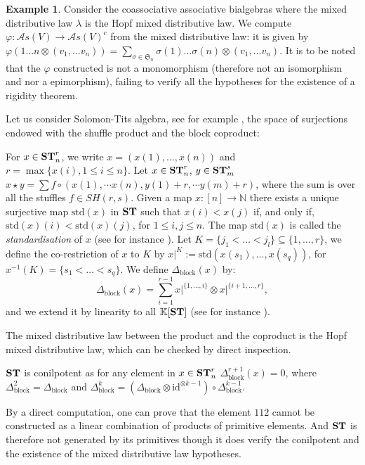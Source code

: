 \documentclass[11pt,leqno]{amsart}
\theoremstyle{definition}
\newtheorem{example}[definition]{Example}
\theoremstyle{plain}
\begin{document}
\begin{example}\label{expleST}
Consider the coassociative associative bialgebras where the mixed distributive law $\lambda$ is the Hopf mixed distributive law.  We compute $\varphi: \mathcal{A}s(V)\to\mathcal{A}s(V)^c$ from the mixed distributive law: it is given by $\varphi(1\ldots n \otimes (v_1, \ldots v_n)) = \sum_{\sigma \in \mathfrak{S}_n} \sigma(1)\ldots\sigma(n) \otimes (v_1, \ldots v_n)$. It is to be noted that the $\varphi$ constructed is not a monomorphism (therefore not an isomorphism and nor a epimorphism), failing to verify all the hypotheses for the existence of a rigidity theorem.

Let us consider Solomon-Tits algebra, see for example \cite{Novelli-Thibon, FNT, Burgunder-Ronco}, the space of surjections endowed with the shuffle product and the block coproduct: 

For $x\in {\mbox {\bf ST}_n^r}$, we write $x = (x(1),\dots ,x(n))$ and $r=\max\{x(i),1\leq i\leq n\}$. Let $x\in {\mbox {\bf ST}_n^r}$, $y\in {\mbox {\bf ST}_m^s}$ $x\star y= \sum f\circ (x(1),\cdots x(n),y(1)+r,\cdots y(m)+r)$, where the sum is over all the stuffles $f\in SH(r,s)$.  Given a map $x:[n]\longrightarrow {\mathbb N}$ there exists a unique surjective map ${\mbox {std}(x)}$ in $ {\mbox {\bf ST}}$ such that $x(i) <x (j)$ if, and only if, ${\mbox {std}(x)}(i) < {\mbox {std}(x)}(j)$, for $1\leq i,j\leq n$. The map ${\mbox {std}(x)}$ is called the {\it standardisation} of $x$ (see for instance \cite{Novelli-Thibon}).  Let $K=\{ j_1<\dots <j_l\}\subseteq \{1,\dots ,r\}$, we define the co-restriction of $x$ to $K$ by $x\vert ^K:={\mbox {std}(x(s_1),\dots ,x(s_q))}$, for $x^{-1}(K)=\{ s_1<\dots <s_q\}$. We define $\Delta_{\textrm{block}}(x)$  by:
\vspace{-0.3cm}
\begin{equation*}
\Delta_{\textrm{block}} (x) = \sum _{i=1}^{r-1} x\vert ^{\{1,\dots , i\}}\otimes x\vert ^{\{ i+1, \dots , r\}},
\end{equation*}
and we extend it by linearity to all $\mathbb K[{\mbox {\bf ST}}]$ (see for instance \cite{Burgunder-Ronco}).


The mixed distributive law between the product and the coproduct is the Hopf mixed distributive law, which can be checked by direct inspection.

 ${\mbox {\bf ST}}$ is conilpotent as for any element in $x\in{\mbox {\bf ST}_n^r}$ $\Delta_{\textrm{block}}^{r+1}(x)=0$, where $\Delta_{\textrm{block}}^2=\Delta_{\textrm{block}}$ and $\Delta_{\textrm{block}}^k=(\Delta_{\textrm{block}}\otimes {\mbox {id}}^{\otimes k-1})\circ \Delta_{\textrm{block}}^{k-1}$.
 
 By a direct computation, one can prove that the element $112$ cannot be constructed as a linear combination of products of primitive elements. And ${\mbox {\bf ST}}$ is therefore not generated by its primitives though it does verify the conilpotent and the existence of the mixed distributive law hypotheses. 
\end{example}
\end{document}
